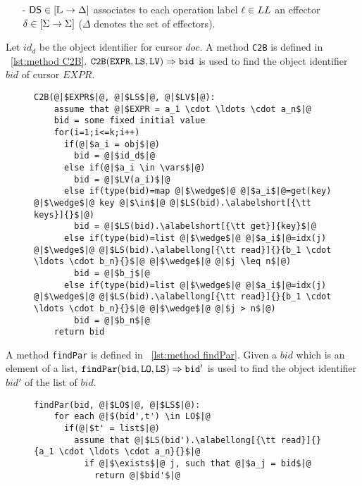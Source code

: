 {\begin{itemize}
\item[-] $\mathsf{DS}\in [\mathbb{L} \rightarrow \Delta]$ associates to each operation label $\ell \in LL$ an effector $\delta\in [\Sigma \rightarrow \Sigma]$ ($\Delta$ denotes the set of effectors).
\end{itemize}

Let $id_d$ be the object identifier for cursor $doc$. A method {\tt C2B} is defined in \figureautorefname~\ref{lst:method C2B}. $\alabellong[{\tt C2B}]{EXPR,LS,LV}{bid}{}$ is used to find the object identifier $bid$ of cursor $EXPR$.

\begin{figure}[t]
\begin{lstlisting}[basicstyle=\ttfamily\scriptsize,caption={\vspace{-1mm}Method {\tt C2B}.},captionpos=b,label={lst:method C2B}]
  C2B(@|$EXPR$|@, @|$LS$|@, @|$LV$|@):
    assume that @|$EXPR = a_1 \cdot \ldots \cdot a_n$|@
    bid = some fixed initial value
    for(i=1;i<=k;i++)
      if(@|$a_i = obj$|@)
        bid = @|$id_d$|@
      else if(@|$a_i \in \vars$|@)
        bid = @|$LV(a_i)$|@
      else if(type(bid)=map @|$\wedge$|@ @|$a_i$|@=get(key) @|$\wedge$|@ key @|$\in$|@ @|$LS(bid).\alabelshort[{\tt keys}]{}$|@)
        bid = @|$LS(bid).\alabelshort[{\tt get}]{key}$|@
      else if(type(bid)=list @|$\wedge$|@ @|$a_i$|@=idx(j) @|$\wedge$|@ @|$LS(bid).\alabellong[{\tt read}]{}{b_1 \cdot \ldots \cdot b_n}{}$|@ @|$\wedge$|@ @|$j \leq n$|@)
        bid = @|$b_j$|@
      else if(type(bid)=list @|$\wedge$|@ @|$a_i$|@=idx(j) @|$\wedge$|@ @|$LS(bid).\alabellong[{\tt read}]{}{b_1 \cdot \ldots \cdot b_n}{}$|@ @|$\wedge$|@ @|$j > n$|@)
        bid = @|$b_n$|@
    return bid
\end{lstlisting}
\vspace{-5mm}
\end{figure}

A method {\tt findPar} is defined in \figureautorefname~\ref{lst:method findPar}. Given a $bid$ which is an element of a list, $\alabellong[{\tt findPar}]{bid,LO,LS}{bid'}{}$ is used to find the object identifier $bid'$ of the list of $bid$.

\begin{figure}[t]
\begin{lstlisting}[basicstyle=\ttfamily\scriptsize,caption={\vspace{-1mm}Method {\tt findPar}.},captionpos=b,label={lst:method findPar}]
  findPar(bid, @|$LO$|@, @|$LS$|@):
    for each @|$(bid',t') \in LO$|@
      if(@|$t' = list$|@)
        assume that @|$LS(bid').\alabellong[{\tt read}]{}{a_1 \cdot \ldots \cdot a_n}{}$|@
          if @|$\exists$|@ j, such that @|$a_j = bid$|@
            return @|$bid'$|@
\end{lstlisting}
\vspace{-5mm}
\end{figure}

}
